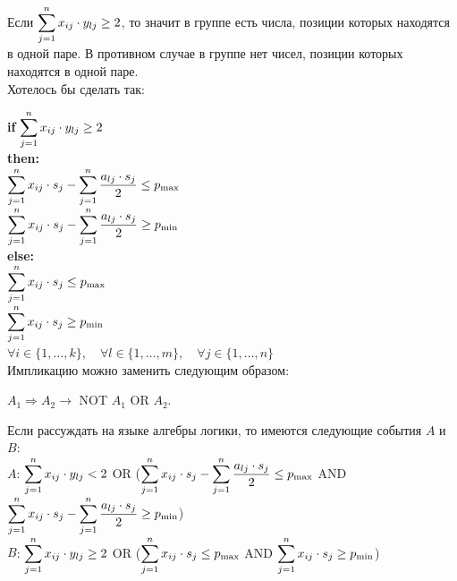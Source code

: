 \documentclass[14pt,fleqn]{extarticle}
\begin{document}
	Если $\smashoperator[r]{\sum_{j=1}^{n}} x_{ij} \cdot y_{lj} \geq 2$, то значит в группе есть числа, позиции которых находятся в одной паре. В противном случае в группе нет чисел, позиции которых находятся в одной паре.\\
	
	Хотелось бы сделать так:
	
	\textbf{if} $\smashoperator[r]{\sum_{j=1}^{n}} x_{ij} \cdot y_{lj} \geq 2$\\
	\textbf{then:}\\
	$\smashoperator[r]{\sum_{j=1}^{n}} x_{ij} \cdot s_j - \smashoperator[r]{\sum_{j=1}^{n}} \dfrac{a_{lj} \cdot s_j}{2} \leq p_{\max}$\\
	$\smashoperator[r]{\sum_{j=1}^{n}} x_{ij} \cdot s_j - \smashoperator[r]{\sum_{j=1}^{n}} \dfrac{a_{lj} \cdot s_j}{2} \geq p_{\min}$\\
	\textbf{else:}\\
	$\smashoperator[r]{\sum_{j=1}^{n}} x_{ij} \cdot s_j \leq p_{\max}$\\
	$\smashoperator[r]{\sum_{j=1}^{n}} x_{ij} \cdot s_j \geq p_{\min}$\\
	
	$\forall i \in \{1, \dots, k\}, \quad \forall l \in \{1, \dots, m\}, \quad \forall j \in \{1, \dots, n\}$\\
	
	Импликацию можно заменить следующим образом:
	\begin{center}
		$A_1 \Rightarrow A_2 \longrightarrow$ NOT $A_1$ OR $A_2$.
	\end{center}
	Если рассуждать на языке алгебры логики, то имеются следующие события $A$ и $B$:\\
	$A$: \hspace{0.1cm} $\smashoperator[r]{\sum_{j=1}^{n}} x_{ij} \cdot y_{lj} < 2$ OR
	($\smashoperator[r]{\sum_{j=1}^{n}} x_{ij} \cdot s_j - \smashoperator[r]{\sum_{j=1}^{n}} \dfrac{a_{lj} \cdot s_j}{2} \leq p_{\max}$ AND $\smashoperator[r]{\sum_{j=1}^{n}} x_{ij} \cdot s_j - \smashoperator[r]{\sum_{j=1}^{n}} \dfrac{a_{lj} \cdot s_j}{2} \geq p_{\min}$)\\
	
	$B$: \hspace{0.1cm} $\smashoperator[r]{\sum_{j=1}^{n}} x_{ij} \cdot y_{lj} \geq 2$ OR ($\smashoperator[r]{\sum_{j=1}^{n}} x_{ij} \cdot s_j \leq p_{\max}$ AND $\smashoperator[r]{\sum_{j=1}^{n}} x_{ij} \cdot s_j \geq p_{\min}$)\\\\
	
\end{document}
